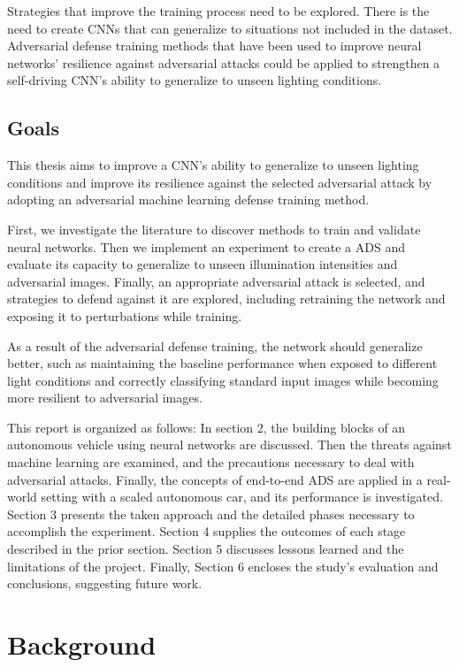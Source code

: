 \documentclass[12pt]{article}
\begin{document}
Strategies that improve the training process need to be explored. There is the need to create CNNs that can generalize to situations not included in the dataset. Adversarial defense training methods that have been used to improve neural networks' resilience against adversarial attacks could be applied to strengthen a self-driving CNN's ability to generalize to unseen lighting conditions.   
 
\subsection{Goals}

This thesis aims to improve a CNN's ability to generalize to unseen lighting conditions and improve its resilience against the selected adversarial attack by adopting an adversarial machine learning defense training method.

First, we investigate the literature to discover methods to train and validate neural networks. Then we implement an experiment to create a ADS and evaluate its capacity to generalize to unseen illumination intensities and adversarial images. Finally, an appropriate adversarial attack is selected, and strategies to defend against it are explored, including retraining the network and exposing it to perturbations while training.

As a result of the adversarial defense training, the network should generalize better, such as maintaining the baseline performance when exposed to different light conditions and correctly classifying standard input images while becoming more resilient to adversarial images.

This report is organized as follows: In section 2, the building blocks of an autonomous vehicle using neural networks are discussed. Then the threats against machine learning are examined, and the precautions necessary to deal with adversarial attacks. Finally, the concepts of end-to-end ADS are applied in a real-world setting with a scaled autonomous car, and its performance is investigated. Section 3 presents the taken approach and the detailed phases necessary to accomplish the experiment. Section 4 supplies the outcomes of each stage described in the prior section. Section 5 discusses lessons learned and the limitations of the project. Finally, Section 6 encloses the study's evaluation and conclusions, suggesting future work. 

\newpage
\section{Background} 
\end{document}
